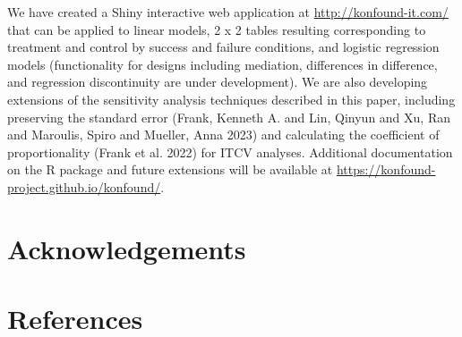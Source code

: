 \documentclass[
]{article}
\begin{document}
We have created a Shiny interactive web application at
\url{http://konfound-it.com/} that can be applied to linear models, 2 x
2 tables resulting corresponding to treatment and control by success and
failure conditions, and logistic regression models (functionality for
designs including mediation, differences in difference, and regression
discontinuity are under development). We are also developing extensions
of the sensitivity analysis techniques described in this paper,
including preserving the standard error (Frank, Kenneth A. and Lin,
Qinyun and Xu, Ran and Maroulis, Spiro and Mueller, Anna 2023) and
calculating the coefficient of proportionality (Frank et al. 2022) for
ITCV analyses. Additional documentation on the R package and future
extensions will be available at
\url{https://konfound-project.github.io/konfound/}.

\hypertarget{acknowledgements}{%
\section{Acknowledgements}\label{acknowledgements}}

\hypertarget{references}{%
\section*{References}\label{references}}
\end{document}
